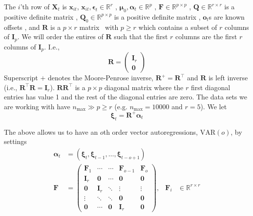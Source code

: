 \documentclass[notitlepage]{article}
\renewcommand{\vec}[1]{\bm{#1}}
\newcommand{\mat}[1]{\mathbf{#1}}
\newcommand{\Lparen}[1]{\left( #1\right)}
\newcommand{\optor}[2]{#1\Lparen{#2}}
\newcommand{\dimState}{p}
\newcommand{\dimRng}{r}
\newcommand{\nMax}{n_{\text{max}}}
\newcommand\MVAR[1]{\optor{\text{VAR}}{#1}}
\begin{document}
The $i$'th row of $\mat{X}_t$ is $\vec{x}_{it}$, $\vec{x}_{it},\vec{\epsilon}_t\in\mathbb{R}^\dimRng$%
, $\vec\mu_0,\vec{\alpha}_t\vec\in\mathbb{R}^\dimState$%
, $\mat{F} \in \mathbb{R}^{\dimState\times\dimState}$%
, $\mat{Q} \in \mathbb{R}^{\dimRng\times\dimRng}$ is a positive definite matrix%
, $\mat{Q}_0 \in \mathbb{R}^{\dimState\times\dimState}$ is a positive definite matrix%
, $\vec{o}_t$s are known offsets%
, and $\mat{R}$ is a $\dimState\times\dimRng$ matrix%
~with $\dimState\geq\dimRng$ which contains a subset of $r$ columns of $\mat{I}_{\dimState}$. We will order the entires of $\mat R$ such that the first $\dimRng$ columns are the 
first $\dimRng$ columns of $\mat{I}_{\dimState}$. I.e.,%
%
$$\mat{R} = \begin{pmatrix}
	\mat I_\dimRng  \\
	\mat 0 
\end{pmatrix}$$%
%
Superscript $+$ denotes the Moore-Penrose inverse, $\mat{R}^+ = \mat{R}^\top$ and $\mat{R}$ is left inverse (i.e., $\mat{R}^\top\mat{R} = \mat{I}_\dimRng$). $\mat{R}\mat{R}^\top$ is a $\dimState\times\dimState$ diagonal matrix where the $\dimRng$ 
first diagonal entries has value 1 and the rest of the diagonal entries are zero. 
The data sets we are working with have 
$\nMax \gg \dimState \geq \dimRng$ (e.g. $\nMax = 10000$ and $\dimRng = 5$). We let %
%
$$\vec{\xi}_{t} = \mat{R}^{+}\vec{\alpha}_t$$

The above allows us to have an $o$th order vector autoregressions, $\MVAR{o}$, by settings%
%
\begin{align*}
\vec\alpha_t &= (\vec\xi_t,\vec\xi_{t-1},\dots, \vec\xi_{t - o + 1}) \\
\mat F &= \begin{pmatrix}
 \mat F_1    & \cdots & \cdots & \mat F_{o-1} & \mat F_o \\
 \mat I_\dimRng    & \mat 0      & \cdots & \mat 0 & \mat 0 \\
 \mat 0      &  \mat I_\dimRng    & \ddots & \vdots & \vdots \\
 \vdots & \ddots & \ddots & \mat 0 & \mat 0 \\
 \mat 0      & \cdots & \mat 0 & \mat I_\dimRng & \mat 0 
\end{pmatrix}, & \mat F_i &\in \mathbb{R}^{\dimRng\times\dimRng}
\end{align*}
\end{document}
